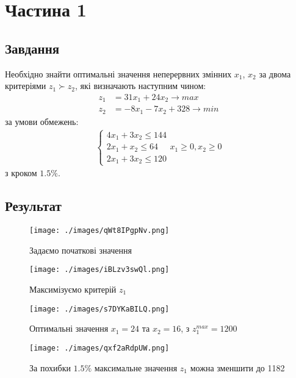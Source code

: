 \section{Частина 1}
\label{sec:task1}

\subsection{Завдання}
\label{subsec:task1_task}

Необхідно знайти оптимальні значення неперервних змінних
$x_1$, $x_2$ за двома критеріями $z_1 \succ z_2$,
які визначають наступним чином:
\begin{align}
    z_1 & = 31x_1 + 24x_2 \rightarrow max      \\
    z_2 & = -8x_1 - 7x_2 + 328 \rightarrow min
\end{align}
за умови обмежень:
\begin{align}
    \begin{cases}
        4x_1 + 3x_2 \leq 144 \\
        2x_1 + x_2 \leq 64   \\
        2x_1 + 3x_2 \leq 120
    \end{cases}
    x_1 \geq 0, x_2 \geq 0
\end{align}
з кроком $1.5\%$.

\subsection{Результат}
\label{subsec:task1_result}

\begin{figure}[!ht]
    \centering
    \texttt{[image: ./images/qWt8IPgpNv.png]}
    \caption{Задаємо початкові значення}
    \label{fig:graph4}
\end{figure}

\begin{figure}[!ht]
    \centering
    \texttt{[image: ./images/iBLzv3swQl.png]}
    \caption{Максимізуємо критерій $z_1$}
    \label{fig:graph2}
\end{figure}

\begin{figure}[!ht]
    \centering
    \texttt{[image: ./images/s7DYKaBILQ.png]}
    \caption{Оптимальні значення $x_1 = 24$ та $x_2 = 16$, з $z_1^{max} = 1200$}
    \label{fig:graph}
\end{figure}

\begin{figure}[!ht]
    \centering
    \texttt{[image: ./images/qxf2aRdpUW.png]}
    \caption{За похибки $1.5\%$ максимальне значення $z_1$ можна зменшити до 1182}
    \label{fig:graph5}
\end{figure}

